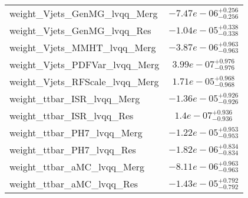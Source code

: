 \begin{tabular}{|l|c|}
weight\_Vjets\_GenMG\_lvqq\_Merg & $-7.47e-06^{+0.256}_{-0.256}$ \\
weight\_Vjets\_GenMG\_lvqq\_Res & $-1.04e-05^{+0.338}_{-0.338}$ \\
weight\_Vjets\_MMHT\_lvqq\_Merg & $-3.87e-06^{+0.963}_{-0.963}$ \\
weight\_Vjets\_PDFVar\_lvqq\_Merg & $3.99e-07^{+0.976}_{-0.976}$ \\
weight\_Vjets\_RFScale\_lvqq\_Merg & $1.71e-05^{+0.968}_{-0.968}$ \\
weight\_ttbar\_ISR\_lvqq\_Merg & $-1.36e-05^{+0.926}_{-0.926}$ \\
weight\_ttbar\_ISR\_lvqq\_Res & $1.4e-07^{+0.936}_{-0.936}$ \\
weight\_ttbar\_PH7\_lvqq\_Merg & $-1.22e-05^{+0.953}_{-0.953}$ \\
weight\_ttbar\_PH7\_lvqq\_Res & $-1.82e-06^{+0.834}_{-0.834}$ \\
weight\_ttbar\_aMC\_lvqq\_Merg & $-8.11e-06^{+0.963}_{-0.963}$ \\
weight\_ttbar\_aMC\_lvqq\_Res & $-1.43e-05^{+0.792}_{-0.792}$ \\
\hline
\end{tabular}
